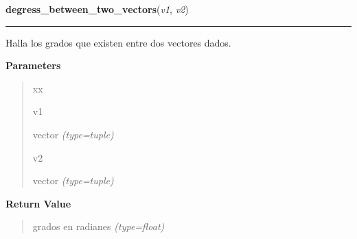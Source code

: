 \hspace{.8\funcindent}\begin{boxedminipage}{\funcwidth}

    \raggedright \textbf{degress\_between\_two\_vectors}(\textit{v1}, \textit{v2})

    \vspace{-1.5ex}

    \rule{\textwidth}{0.5\fboxrule}
\setlength{\parskip}{2ex}
Halla los grados que existen entre dos vectores dados.

\setlength{\parskip}{1ex}
      \textbf{Parameters}
      \vspace{-1ex}

      \begin{quote}
        \begin{Ventry}{xx}

          \item[v1]


vector
            {\it (type=tuple)}

          \item[v2]


vector
            {\it (type=tuple)}

        \end{Ventry}

      \end{quote}

      \textbf{Return Value}
    \vspace{-1ex}

      \begin{quote}

grados en radianes
      {\it (type=float)}

      \end{quote}

    \end{boxedminipage}

    \label{src:check_goban_moved:check_directions}

    \vspace{0.5ex}

